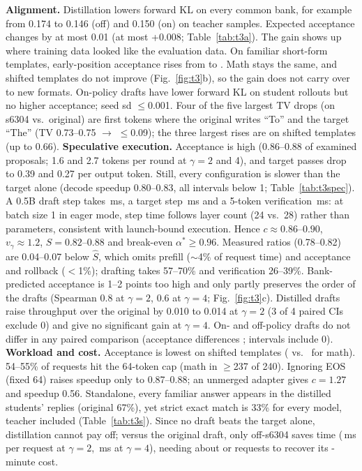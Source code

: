 \documentclass{article}
\begin{document}
\textbf{Alignment.} Distillation lowers forward KL on every common bank, for example from 0.174 to 0.146 (off) and 0.150 (on) on teacher samples. Expected acceptance changes by at most 0.01 (at most +0.008; Table~\ref{tab:t3a}).
The gain shows up where training data looked like the evaluation data. On familiar short-form templates, early-position acceptance rises from \FamExpOrig{} to \FamExpOff. Math stays the same, and shifted templates do not improve (Fig.~\ref{fig:t3}b), so the gain does not carry over to new formats.
On-policy drafts have lower forward KL on student rollouts but no higher acceptance; seed sd $\le$0.001. Four of the five largest TV drops (on s6304 vs.\ original) are first tokens where the original writes ``To'' and the target ``The'' (TV 0.73--0.75 $\to$ $\le$0.09); the three largest rises are on shifted templates (up to 0.66).
\textbf{Speculative execution.} Acceptance is high (0.86--0.88 of examined proposals; 1.6 and 2.7 tokens per round at $\gamma=2$ and 4), and target passes drop to 0.39 and 0.27 per output token. Still, every configuration is slower than the target alone (decode speedup 0.80--0.83, all intervals below 1; Table~\ref{tab:t3spec}). A 0.5B draft step takes \StepDraft\,ms, a target step \StepTarget\,ms and a 5-token verification \StepVerifyFive\,ms: at batch size 1 in eager mode, step time follows layer count (24 vs.\ 28) rather than parameters, consistent with launch-bound execution. Hence $c\approx0.86$--$0.90$, $v_\gamma\approx1.2$, $\hat S=0.82$--$0.88$ and break-even $\alpha^*\ge0.96$. Measured ratios (0.78--0.82) are 0.04--0.07 below $\hat S$, which omits prefill ($\sim$4\% of request time) and acceptance and rollback ($<$1\%); drafting takes 57--70\% and verification 26--39\%. Bank-predicted acceptance is 1--2 points too high and only partly preserves the order of the drafts (Spearman 0.8 at $\gamma{=}2$, 0.6 at $\gamma{=}4$; Fig.~\ref{fig:t3}c). Distilled drafts raise throughput over the original by 0.010 to 0.014 at $\gamma{=}2$ (3 of 4 paired CIs exclude 0) and give no significant gain at $\gamma{=}4$. On- and off-policy drafts do not differ in any paired comparison (acceptance differences \OnOffRange; \OnOffAllZero{} intervals include 0).
\textbf{Workload and cost.} Acceptance is lowest on shifted templates (\ShAccOff{} vs.\ \MathAccOff{} for math). 54--55\% of requests hit the 64-token cap (math in $\ge$237 of 240). Ignoring EOS (fixed 64) raises speedup only to 0.87--0.88; an unmerged adapter gives $c=1.27$ and speedup 0.56.
Standalone, every familiar answer appears in the distilled students' replies (original 67\%), yet strict exact match is 33\% for every model, teacher included (Table~\ref{tab:t3s}).
Since no draft beats the target alone, distillation cannot pay off; versus the original draft, only off-s6304 saves time (\BeSaveTwo\,ms per request at $\gamma{=}2$, \BeSave\,ms at $\gamma{=}4$), needing about \BeReqTwo{} or \BeReq{} requests to recover its \BeCost-minute cost.
\end{document}
